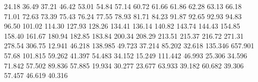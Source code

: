 24.18
36.49
37.21
46.42
53.01
54.84
57.14
60.72
61.66
61.86
62.28
63.13
66.18
71.01
72.63
73.39
75.43
76.24
77.55
78.93
81.71
84.23
91.87
92.65
92.93
94.83
96.50
101.02
114.30
127.93
128.26
134.41
136.14
140.82
143.74
144.43
154.85
158.40
161.67
180.94
182.85
183.84
200.34
208.29
213.51
215.37
216.72
271.31
278.54
306.75
12.941
46.218
138.985
49.723
37.214
85.202
32.618
135.346
657.901
57.68
101.815
59.262
41.397
54.483
34.152
15.249
111.442
46.993
25.306
34.596
71.842
57.502
89.836
57.885
19.934
30.277
23.677
63.933
39.182
60.682
39.306
57.457
46.619
40.316
